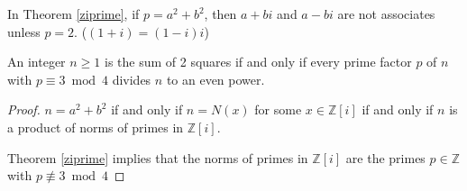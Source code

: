 \begin{remark}
    In Theorem \eqref{ziprime}, if \(p = a^2 + b^2\), then \(a + bi\) and \(a - bi\) are not associates unless \(p = 2\). (\((1 + i) = (1-i)i\))
\end{remark}
\begin{corollary}
    \label{sumofsquare}
    An integer \(n \geq 1\) is the sum of 2 squares if and only if every prime factor \(p\) of \(n\) with \(p \equiv 3 \bmod 4\) divides \(n\) to an even power.
\end{corollary}
\begin{proof}
    \(n = a^2 + b^2\) if and only if \(n = N(x)\) for some \(x \in \mathbb{Z}[i]\) if and only if \(n\) is a product of norms of primes in \(\mathbb{Z}[i]\).

    Theorem \eqref{ziprime} implies that the norms of primes in \(\mathbb{Z}[i]\) are the primes \(p \in \mathbb{Z}\) with \(p \not \equiv 3 \bmod 4\) 
\end{proof}